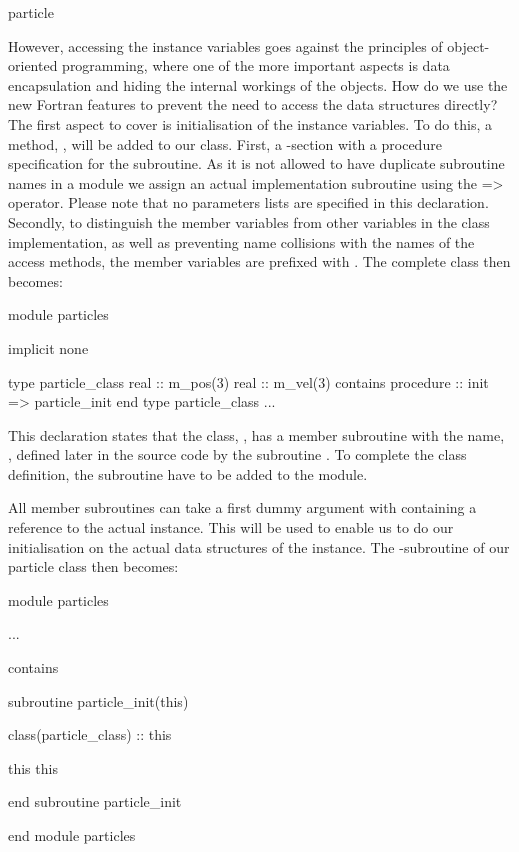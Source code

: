\begin{fortrancodeenv}
particle %
\end{fortrancodeenv}

However, accessing the instance variables goes against the principles of object-oriented programming, where one of the more important aspects is data encapsulation and hiding the internal workings of the objects. How do we use the new Fortran features to prevent the need to access the data structures directly? The first aspect to cover is initialisation of the instance  variables. To do this, a method, , will be added to our class. First, a -section with a procedure specification for the  subroutine. As it is not allowed to have duplicate subroutine names in a module we assign an actual implementation subroutine using the => operator. Please note that no parameters lists are specified in this declaration. Secondly, to distinguish the member variables from other variables in the class implementation, as well as preventing name collisions with the names of the access methods, the member variables are prefixed with . The complete class then becomes:

\begin{fortrancodeenv}
module particles

    implicit none

    type particle_class
        real :: m_pos(3)
        real :: m_vel(3)
    contains
        procedure :: init => particle_init
    end type particle_class
    ...
\end{fortrancodeenv}

This declaration states that the class, , has a member subroutine with the name, , defined later in the source code by the subroutine . To complete the class definition, the subroutine  have to be added to the  module.

All member subroutines can take a first dummy argument with containing a reference to the actual instance. This will be used to enable us to do our initialisation on the actual data structures of the instance. The -subroutine of our particle class then becomes:

\begin{fortrancodeenv}
module particles

...

contains

subroutine particle_init(this)

    class(particle_class) :: this

    this %
    this %

end subroutine particle_init

end module particles
\end{fortrancodeenv}

